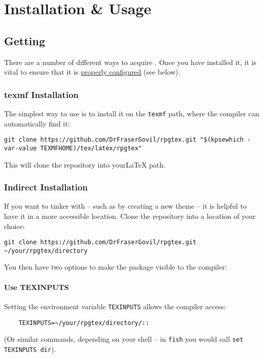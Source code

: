 \chapter{Installation \& Usage}

	\section{Getting \rpgtex}

		There are a number of different ways to acquire \rpgtex{}. Once you have installed it, it is vital to ensure that it is \href{\ref{S:Configuration}}{properly configured} (see below).


		\subsection{texmf Installation}

			The simplest way to use \rpgtex{} is to install it on the \texttt{texmf} path, where the compiler can automatically find it:

			\begin{lstlisting}
git clone https://github.com/DrFraserGovil/rpgtex.git "$(kpsewhich -var-value TEXMFHOME)/tex/latex/rpgtex"
			\end{lstlisting}

			This will clone the repository into your\LaTeX{} path.

		\subsection{Indirect Installation}

			If you want to tinker with \rpgtex{} -- such as by creating a new theme -- it is helpful to have it in a more accessible location. Clone the repository into a location of your choice:

			\begin{lstlisting}
git clone https://github.com/DrFraserGovil/rpgtex.git ~/your/rpgtex/directory
			\end{lstlisting}

			You then have two options to make the package visible to the compiler:

			\subsubsection{Use TEXINPUTS}

			Setting the environment variable \verb|TEXINPUTS| allows the compiler access:
				\begin{lstlisting}
	TEXINPUTS=~/your/rpgtex/directory/::
				\end{lstlisting}
				(Or similar commands, depending on your shell -- in \texttt{fish} you would call \verb|set TEXINPUTS dir|).

